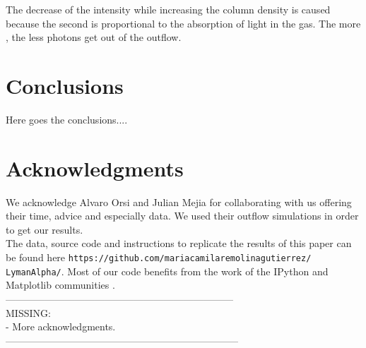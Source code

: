 \documentclass{latex/emulateapj}
\begin{document}
The decrease of the intensity while increasing the column density is caused because the second is proportional to the absorption of light in the gas. The more \lognh, the less photons get out of the outflow.

\section{Conclusions}
\label{sec:conclusions}
Here goes the conclusions....

\section*{Acknowledgments}

We acknowledge Alvaro Orsi and Julian Mejia for collaborating with us offering their time, advice and especially data. We used their outflow simulations in order to get our results.\\

The data, source code and instructions to replicate the results of this paper can be found here {\texttt{https://github.com/mariacamilaremolinagutierrez/ LymanAlpha/}}.
Most of our code benefits from the work of the IPython and Matplotlib communities \citep{IPython,matplotlib}.\\

---------------------------------------------------------------------\\
MISSING: \\
- More acknowledgments.\\
-----------------------------------------------------------------------\\




\newpage
\end{document}
